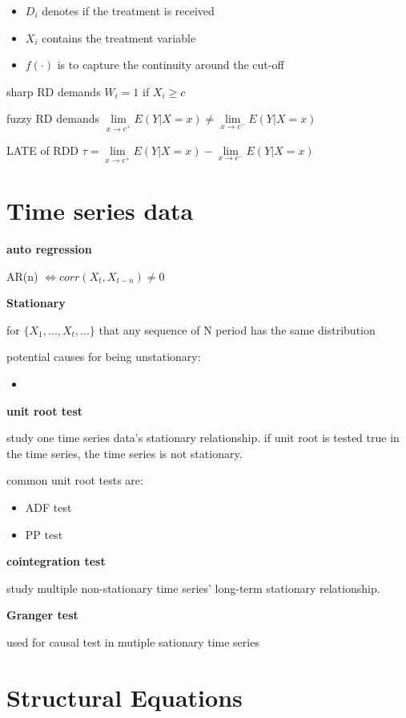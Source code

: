 \documentclass{article}
\providecommand{\tightlist}{
  \setlength{\itemsep}{0pt}
  \setlength{\parskip}{0pt}}
\begin{document}
\begin{itemize}
\tightlist
  \item $D_i$ denotes if the treatment is received
  \item $X_i$ contains the treatment variable
  \item $f(\cdot)$ is to capture the continuity around the cut-off
\end{itemize}

sharp RD demands $W_i=1$ if $X_i\geqslant c$

fuzzy RD demands $\lim\limits_{x \rightarrow c^+} E(Y|X=x)\neq\lim\limits_{x \rightarrow c^-} E(Y|X=x)$

LATE of RDD $\tau=\lim\limits_{x \rightarrow c^+} E(Y|X=x)-\lim\limits_{x \rightarrow c^-} E(Y|X=x)$


\section{Time series data}

\textbf{auto regression}

AR(n) $\iff corr(X_t,X_{t-n})\neq 0$

\textbf{Stationary}

for $\{X_1,\dots,X_t,\dots\}$ that any sequence of N period has the same distribution

potential causes for being unstationary:
\begin{itemize}
\tightlist
  \item 
\end{itemize}


\textbf{unit root test}

study one time series data's stationary relationship. if unit root is tested true in the time series, the time series is not stationary.

common unit root tests are:
\begin{itemize}
\tightlist
  \item ADF test
  \item PP test
\end{itemize}

\textbf{cointegration test}

study multiple non-stationary time series' long-term stationary relationship.

\textbf{Granger test}

used for causal test in mutiple sationary time series


\section{Structural Equations}
\end{document}

